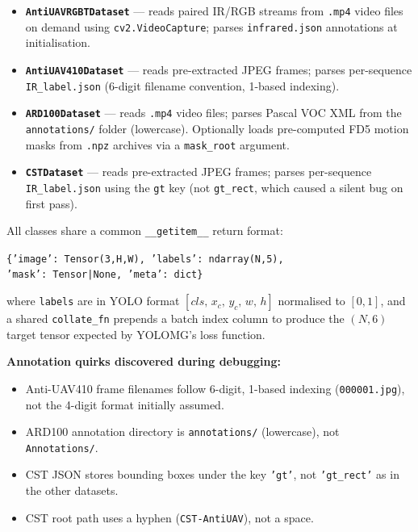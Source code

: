 \begin{itemize}
    \item \textbf{\texttt{AntiUAVRGBTDataset}} — reads paired IR/RGB
          streams from \texttt{.mp4} video files on demand using
          \texttt{cv2.VideoCapture}; parses \texttt{infrared.json}
          annotations at initialisation.
    \item \textbf{\texttt{AntiUAV410Dataset}} — reads pre-extracted
          JPEG frames; parses per-sequence \texttt{IR\_label.json}
          (6-digit filename convention, 1-based indexing).
    \item \textbf{\texttt{ARD100Dataset}} — reads \texttt{.mp4} video
          files; parses Pascal VOC XML from the \texttt{annotations/}
          folder (lowercase). Optionally loads pre-computed FD5 motion
          masks from \texttt{.npz} archives via a \texttt{mask\_root}
          argument.
    \item \textbf{\texttt{CSTDataset}} — reads pre-extracted JPEG
          frames; parses per-sequence \texttt{IR\_label.json} using
          the \texttt{gt} key (not \texttt{gt\_rect}, which caused
          a silent bug on first pass).
\end{itemize}

All classes share a common \texttt{\_\_getitem\_\_} return format:

\begin{center}
{\small\texttt{\{'image': Tensor(3,H,W), 'labels': ndarray(N,5),}}\\
{\small\texttt{\phantom{\{}'mask': Tensor|None, 'meta': dict\}}}
\end{center}

\noindent where \texttt{labels} are in YOLO format
$[\mathit{cls},\, x_c,\, y_c,\, w,\, h]$ normalised to $[0,1]$, and
a shared \texttt{collate\_fn} prepends a batch index column to produce
the $(N,6)$ target tensor expected by YOLOMG's loss function.

\textbf{Annotation quirks discovered during debugging:}

\begin{itemize}
    \item Anti-UAV410 frame filenames follow 6-digit, 1-based
          indexing (\texttt{000001.jpg}), not the 4-digit format
          initially assumed.
    \item ARD100 annotation directory is \texttt{annotations/}
          (lowercase), not \texttt{Annotations/}.
    \item CST JSON stores bounding boxes under the key \texttt{'gt'},
          not \texttt{'gt\_rect'} as in the other datasets.
    \item CST root path uses a hyphen (\texttt{CST-AntiUAV}), not a
          space.
\end{itemize}

